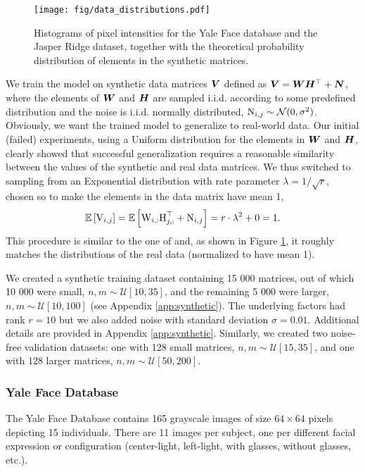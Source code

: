 \documentclass{article}
\begin{document}
\begin{figure}
    \centering
    \texttt{[image: fig/data\_distributions.pdf]}
    \caption{Histograms of pixel intensities for the Yale Face database and the Jasper Ridge dataset, together with the theoretical probability distribution of elements in the synthetic matrices.}
    \label{fig:data_dist}
\end{figure}
We train the model on synthetic data matrices ${\bm{V}}$ defined as ${\bm{V}}={\bm{W}}{\bm{H}}^\top+{\bm{N}}$, where the elements of ${\bm{W}}$ and ${\bm{H}}$ are sampled i.i.d. according to some predefined distribution and the noise is i.i.d. normally distributed, ${\textnormal{N}}_{i,j}\sim \mathcal{N}(0,\sigma^2)$. Obviously, we want the trained model to generalize to real-world data. Our initial (failed) experiments, using a Uniform distribution for the elements in ${\bm{W}}$ and ${\bm{H}}$, clearly showed that successful generalization requires a reasonable similarity between the values of the synthetic and real data matrices. We thus switched to sampling from an Exponential distribution with rate parameter $\lambda=1/\sqrt{r}$, chosen so to make the elements in the data matrix have mean 1, 
\begin{equation}
    \mathbb{E}\left[{\textnormal{V}}_{i,j}\right]=\mathbb{E}\left[{\textnormal{W}}_{i,:}{\textnormal{H}}_{j,:}^\top+{\textnormal{N}}_{i,j}\right]= r\cdot\lambda^2 + 0 = 1.
\end{equation}
This procedure is similar to the one of \citet{Huang2016} and, as shown in Figure \ref{fig:data_dist}, it roughly matches the distributions of the real data (normalized to have mean 1). 

We created a synthetic training dataset containing 15 000 matrices, out of which 10 000 were small, $n,m\sim \mathcal{U}[10,35]$, and the remaining 5 000 were larger, $n,m\sim \mathcal{U}[10,100]$ (see Appendix \ref{app:synthetic}). The underlying factors had rank $r=10$ but we also added noise with standard deviation $\sigma=0.01$. Additional details are provided in Appendix \ref{app:synthetic}. Similarly, we created two noise-free validation datasets: one with 128 small matrices, $n,m\sim \mathcal{U}[15,35]$, and one with 128 larger matrices, $n,m\sim \mathcal{U}[50,200]$. 

\subsubsection{Yale Face Database }
The Yale Face Database \cite{belhumeur1997eigenfaces} contains 165 grayscale images of size $64 \times 64$ pixels depicting 15 individuals. There are 11 images per subject, one per different facial expression or configuration (center-light, left-light, with glasses, without glasses, etc.). 
\end{document}
